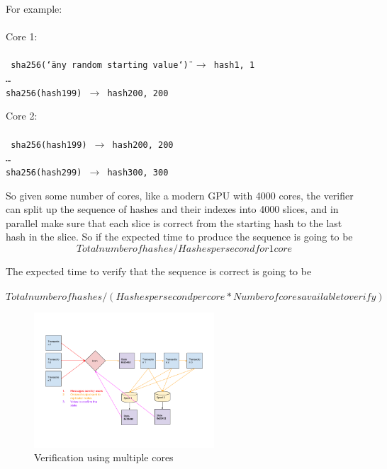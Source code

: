 \documentclass[12pt]{article}
\begin{document}
\noindent For example: \\\\\noindent
\noindent Core 1: \\\\\noindent
\texttt{
sha256(\char`\"any random starting value\char`\") $\rightarrow$ hash1, 1\\
\ldots\\
sha256(hash199) $\rightarrow$ hash200, 200\\
}

\noindent Core 2: \\\\\noindent
\texttt{
sha256(hash199) $\rightarrow$ hash200, 200\\
\ldots\\
sha256(hash299) $\rightarrow$ hash300, 300\\
}

So given some number of cores, like a modern GPU with 4000 cores, the verifier can split up the sequence of hashes and their indexes into 4000 slices, and in parallel make sure that each slice is correct from the starting hash to the last hash in the slice.  So if the expected time to produce the sequence is going to be\\
\[Total number of hashes/Hashes per second for 1 core\]

\noindent The expected time to verify that the sequence is correct is going to be \\\\\noindent
\[Total number of hashes/(Hashes per second per core * Number of cores available to verify)\]

\begin{figure}
  \begin{center}
    \centering
    \includegraphics[width=0.6\textwidth]{figures/fig_4.png}
    \caption[Figure 4]{Verification using multiple cores\label{fig:poh_verify}}
  \end{center}
  \end{figure}
\end{document}
